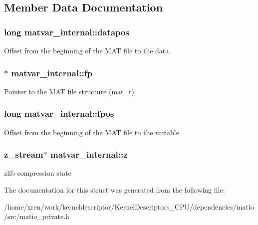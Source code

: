 \subsection{Member Data Documentation}
\hypertarget{structmatvar__internal_afd3bfaab126a160bd6855563e1ea0a7e}{
\subsubsection[{datapos}]{\setlength{\rightskip}{0pt plus 5cm}long {\bf matvar\_\-internal::datapos}}}
\label{structmatvar__internal_afd3bfaab126a160bd6855563e1ea0a7e}
Offset from the beginning of the MAT file to the data \hypertarget{structmatvar__internal_a73f9faaa71fa20ca1cb48e32bcc67351}{
\subsubsection[{fp}]{$\ast$ {\bf matvar\_\-internal::fp}}}
\label{structmatvar__internal_a73f9faaa71fa20ca1cb48e32bcc67351}
Pointer to the MAT file structure (mat\_\-t) \hypertarget{structmatvar__internal_af64eef69fa4be3b068789d816dedd619}{
\subsubsection[{fpos}]{\setlength{\rightskip}{0pt plus 5cm}long {\bf matvar\_\-internal::fpos}}}
\label{structmatvar__internal_af64eef69fa4be3b068789d816dedd619}
Offset from the beginning of the MAT file to the variable \hypertarget{structmatvar__internal_a65fb91d70ebba50dd69f6433a5ef2461}{
\subsubsection[{z}]{\setlength{\rightskip}{0pt plus 5cm}z\_\-stream$\ast$ {\bf matvar\_\-internal::z}}}
\label{structmatvar__internal_a65fb91d70ebba50dd69f6433a5ef2461}
zlib compression state 

The documentation for this struct was generated from the following file:\begin{DoxyCompactItemize}
\item 
/home/xren/work/kerneldescriptor/KernelDescriptors\_\-CPU/dependencies/matio/src/matio\_\-private.h\end{DoxyCompactItemize}
